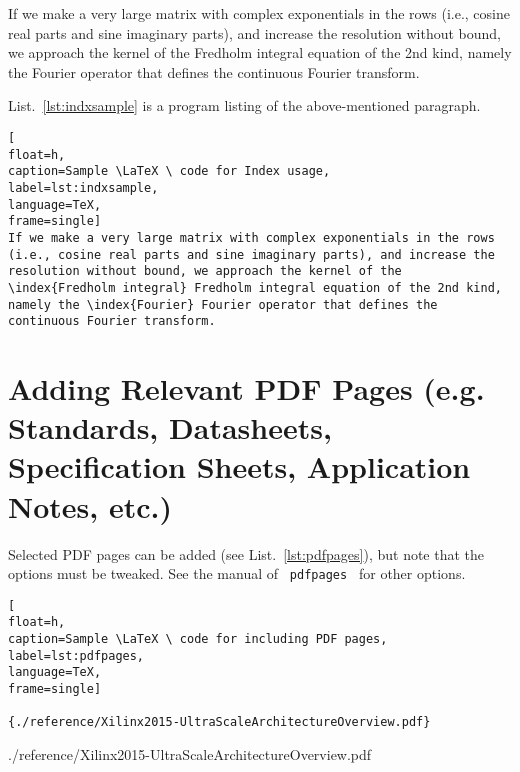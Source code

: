 If we make a very large matrix with complex exponentials in the rows (i.e., cosine real parts and sine imaginary parts), and increase the resolution without bound, we approach the kernel of the  Fredholm integral equation of the 2nd kind, namely the  Fourier operator that defines the continuous Fourier transform. 

List.~\ref{lst:indxsample} is a program listing of the above-mentioned paragraph.

\begin{lstlisting}[
float=h,
caption=Sample \LaTeX \ code for Index usage, 
label=lst:indxsample,
language=TeX,
frame=single]
If we make a very large matrix with complex exponentials in the rows (i.e., cosine real parts and sine imaginary parts), and increase the resolution without bound, we approach the kernel of the \index{Fredholm integral} Fredholm integral equation of the 2nd kind, namely the \index{Fourier} Fourier operator that defines the continuous Fourier transform.
\end{lstlisting}
\cleardoublepage




\newpage
\section{Adding Relevant PDF Pages (e.g. Standards, Datasheets, Specification Sheets, Application Notes, etc.)}

Selected PDF pages can be added (see List.~\ref{lst:pdfpages}), but note that the options must be tweaked.  See the manual of \verb| pdfpages | for other options. 

\begin{lstlisting}[
float=h,
caption=Sample \LaTeX \ code for including PDF pages, 
label=lst:pdfpages,
language=TeX,
frame=single]

{./reference/Xilinx2015-UltraScaleArchitectureOverview.pdf}
\end{lstlisting}
\cleardoublepage


{./reference/Xilinx2015-UltraScaleArchitectureOverview.pdf}




	

